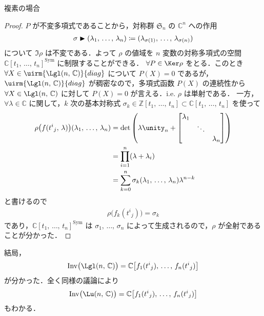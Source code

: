 \documentclass[TQFT_main]{subfiles}
\begin{document}
\begin{myexample}[label=case:complex]{複素の場合}
    \begin{proof}
        $P$ が不変多項式であることから，対称群 $\mathfrak{S}_n$ の $\mathbb{C}^n$ への作用
        \begin{align}
            \sigma \blacktriangleright (\lambda_1,\,\dots,\, \lambda_n) \coloneqq (\lambda_{\sigma(1)},\, \dots,\, \lambda_{\sigma(n)})
        \end{align}
        について $\Im \rho$ は不変である．よって $\rho$ の値域を $n$ 変数の対称多項式の空間 $\mathbb{C}[t_1,\,\dots,\, t_n]^{\mathrm{Sym}}$ に制限することができる．
        $\forall P \in \Ker \rho$ をとる．このとき $\forall X \in \uirm{\Lgl(n,\, \mathbb{C})}{diag}$ について $P(X) = 0$ であるが，$\uirm{\Lgl(n,\, \mathbb{C})}{diag}$ が稠密なので，多項式函数 $P(X)$ の連続性から $\forall X \in \Lgl(n,\, \mathbb{C})$ に対して $P(X) = 0$ が言える．i.e. $\rho$ は単射である．
        一方，$\forall \lambda \in \mathbb{C}$ に関して，$k$ 次の基本対称式 $\sigma_k \in \mathbb{Z}[t_1,\, \dots,\, t_n] \subset \mathbb{C} [t_1,\, \dots,\, t_n]$ を使って
        \begin{align}
            \rho \bigl( f(t^i{}_j,\, \lambda) \bigr) (\lambda_1,\, \dots,\, \lambda_n)
            &= \det \left( \lambda \unity_n + \mqty[\dmat{\lambda_1,\ddots,\lambda_n}] \right) \\
            &= \prod_{i=1}^n (\lambda + \lambda_i) \\
            &= \sum_{k=0}^n \sigma_k(\lambda_1,\, \dots,\, \lambda_n) \lambda^{n-k}
        \end{align}
        と書けるので 
        \begin{align}
            \rho \bigl( f_k(t^i{}_j) \bigr) = \sigma_k
        \end{align}
        であり，$\mathbb{C}[t_1,\,\dots,\, t_n]^{\mathrm{Sym}}$ は $\sigma_1,\, \dots,\, \sigma_n$ によって生成されるので，$\rho$ が全射であることが分かった．
    \end{proof}
    結局，
    \begin{align}
        \mathrm{Inv} \bigl( \Lgl(n,\, \mathbb{C}) \bigr) = \mathbb{C} \bigl[ f_1(t^i{}_j),\, \dots,\, f_n(t^i{}_j) \bigr] 
    \end{align}
    が分かった．全く同様の議論により
    \begin{align}
        \mathrm{Inv} \bigl( \Lu(n,\, \mathbb{C}) \bigr) = \mathbb{C} \bigl[ f_1(t^i{}_j),\, \dots,\, f_n(t^i{}_j) \bigr] 
    \end{align}
    もわかる．
\end{myexample}
\end{document}
